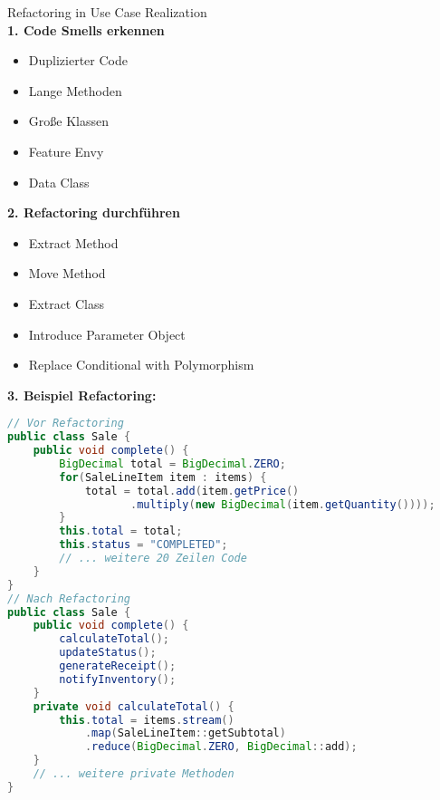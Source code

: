 \begin{KR}{Refactoring in Use Case Realization}\\
\textbf{1. Code Smells erkennen}
\begin{itemize}
    \item Duplizierter Code
    \item Lange Methoden
    \item Große Klassen
    \item Feature Envy
    \item Data Class
\end{itemize}

\textbf{2. Refactoring durchführen}
\begin{itemize}
    \item Extract Method
    \item Move Method
    \item Extract Class
    \item Introduce Parameter Object
    \item Replace Conditional with Polymorphism
\end{itemize}

\textbf{3. Beispiel Refactoring:}
\begin{lstlisting}[language=Java, style=basesmol]
// Vor Refactoring
public class Sale {
    public void complete() {
        BigDecimal total = BigDecimal.ZERO;
        for(SaleLineItem item : items) {
            total = total.add(item.getPrice()
                   .multiply(new BigDecimal(item.getQuantity())));
        }
        this.total = total;
        this.status = "COMPLETED";
        // ... weitere 20 Zeilen Code
    }
}
// Nach Refactoring
public class Sale {
    public void complete() {
        calculateTotal();
        updateStatus();
        generateReceipt();
        notifyInventory();
    }
    private void calculateTotal() {
        this.total = items.stream()
            .map(SaleLineItem::getSubtotal)
            .reduce(BigDecimal.ZERO, BigDecimal::add);
    }
    // ... weitere private Methoden
}
\end{lstlisting}
\end{KR}


